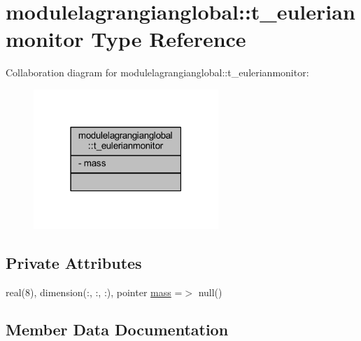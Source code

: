 \hypertarget{structmodulelagrangianglobal_1_1t__eulerianmonitor}{}\section{modulelagrangianglobal\+:\+:t\+\_\+eulerianmonitor Type Reference}
\label{structmodulelagrangianglobal_1_1t__eulerianmonitor}


Collaboration diagram for modulelagrangianglobal\+:\+:t\+\_\+eulerianmonitor\+:\nopagebreak
\begin{figure}[H]
\begin{center}
\leavevmode
\includegraphics[width=198pt]{structmodulelagrangianglobal_1_1t__eulerianmonitor__coll__graph}
\end{center}
\end{figure}
\subsection*{Private Attributes}
\begin{DoxyCompactItemize}
\item 
real(8), dimension(\+:, \+:, \+:), pointer \mbox{\hyperlink{structmodulelagrangianglobal_1_1t__eulerianmonitor_a4e523db949a6f4a8c99f0d9e739441d4}{mass}} =$>$ null()
\end{DoxyCompactItemize}


\subsection{Member Data Documentation}
\mbox{\label{structmodulelagrangianglobal_1_1t__eulerianmonitor_a4e523db949a6f4a8c99f0d9e739441d4}} 
